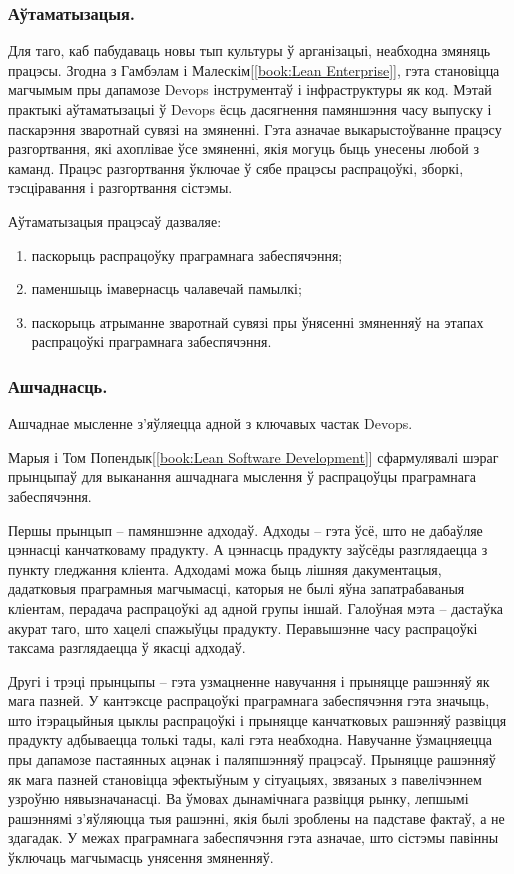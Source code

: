 \subsubsection{Аўтаматызацыя.}

Для таго, каб пабудаваць новы тып культуры ў арганізацыі,
неабходна змяняць працэсы.
Згодна з Гамбэлам і Малескім[\ref{book:Lean Enterprise}],
гэта становіцца магчымым пры дапамозе Devops інструментаў і 
інфраструктуры як код. Мэтай практыкі аўтаматызацыі ў Devops
ёсць дасягнення памяншэння часу выпуску і паскарэння зваротнай
сувязі на змяненні.
Гэта азначае выкарыстоўванне працэсу разгортвання,
які ахоплівае ўсе змяненні, якія могуць быць унесены любой з каманд.
Працэс разгортвання ўключае ў сябе працэсы распрацоўкі, зборкі,
тэсціравання і разгортвання сістэмы.

Аўтаматызацыя працэсаў дазваляе:
\begin{enumerate}
    \item паскорыць распрацоўку праграмнага забеспячэння;
    \item паменшыць імавернасць чалавечай памылкі;
    \item паскорыць атрыманне зваротнай сувязі пры ўнясенні змяненняў
          на этапах распрацоўкі праграмнага забеспячэння.
\end{enumerate}

\subsubsection{Ашчаднасць.}
Ашчаднае мысленне з'яўляецца адной з ключавых частак Devops.

Марыя і Том Попендык[\ref{book:Lean Software Development}]
сфармулявалі шэраг прынцыпаў для выканання ашчаднага мыс\-лен\-ня ў
распрацоўцы праграмнага забеспячэння.

Першы прынцып -- памяншэнне адходаў.
Адходы -- гэта ўсё, што не дабаўляе цэннасці канчатковаму прадукту.
А цэннасць прадукту заўсёды разглядаецца з пункту гледжання кліента.
Адходамі можа быць лішняя дакументацыя, дадатковыя праграмныя магчымасці,
каторыя не былі яўна запатрабаваныя кліентам,
перадача распрацоўкі ад адной групы іншай.
Галоўная мэта -- дастаўка акурат таго, што хацелі спажыўцы прадукту.
Перавышэнне часу распрацоўкі таксама разглядаецца ў якасці адходаў.

Другі і трэці прынцыпы -- гэта узмацненне навучання і прыняцце рашэнняў як
мага пазней. У кантэксце распрацоўкі праграмнага забеспячэння гэта
значыць, што ітэрацыйныя цыклы распрацоўкі і прыняцце канчатковых
рашэнняў развіцця прадукту адбываецца толькі тады, калі гэта неабходна.
Навучанне ўзмацняецца пры дапамозе пастаянных ацэнак і паляпшэнняў працэсаў.
Прыняцце рашэнняў як мага пазней становіцца эфектыўным у сітуацыях,
звязаных з павелічэннем узроўню нявызначанасці.
Ва ўмовах дынамічнага развіцця рынку, лепшымі рашэннямі з'яўляюцца тыя
рашэнні, якія былі зроблены на падставе фактаў, а не здагадак.
У межах праграмнага забеспячэння гэта азначае, што сістэмы павінны
ўключаць магчымасць унясення змяненняў.


